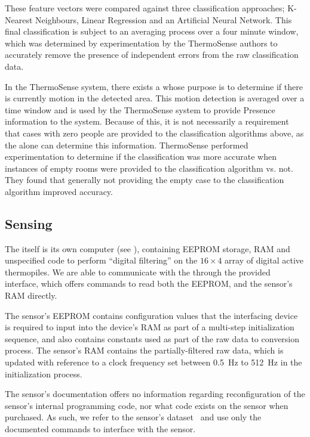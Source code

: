 \documentclass[../thesis/thesis.tex]{subfiles}
\begin{document}
These feature vectors were compared against three classification approaches; K-Nearest Neighbours, Linear Regression and an Artificial Neural Network. This final classification is subject to an averaging process over a four minute window, which was determined by experimentation by the ThermoSense authors to accurately remove the presence of independent errors from the raw classification data.

In the ThermoSense system, there exists a \pir whose purpose is to determine if there is currently motion in the detected area. This motion detection is averaged over a time window and is used by the ThermoSense system to provide Presence information to the system. Because of this, it is not necessarily a requirement that cases with zero people are provided to the classification algorithms above, as the \pir alone can determine this information. ThermoSense performed experimentation to determine if the classification was more accurate when instances of empty rooms were provided to the classification algorithm vs. not. They found that generally not providing the empty case to the classification algorithm improved accuracy.

\subsection{Sensing}
The \mlx itself is its own computer (see ), containing EEPROM storage, RAM and unspecified code to perform ``digital filtering'' on the $16 \times 4$ array of digital active thermopiles. We are able to communicate with the \mlx through the provided \iic interface, which offers commands to read both the EEPROM, and the sensor's RAM directly. 

The sensor's EEPROM contains configuration values that the interfacing device is required to input into the device's RAM as part of a multi-step initialization sequence, and also contains constants used as part of the raw data to \dc conversion process. The sensor's RAM contains the partially-filtered raw data, which is updated with reference to a clock frequency set between 0.5~Hz to 512~Hz in the initialization process.

The sensor's documentation offers no information regarding reconfiguration of the sensor's internal programming code, nor what code exists on the sensor when purchased. As such, we refer to the sensor's dataset~\cite{MLXDatasheet} and use only the documented commands to interface with the sensor.
\end{document}
